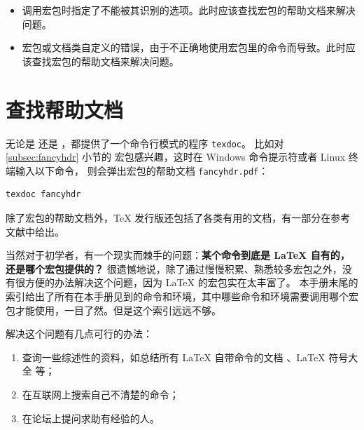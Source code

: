\begin{itemize}
相比之前的“Option clash”，隐性宏包冲突是更难以解决的问题，对各种宏包不熟悉的用户，尤其是使用模板的用户而言，往往难以下手。
用户可尝试查找引起冲突的宏包的帮助文档。详尽的手册里通常会告知用户这个宏包应当在某个宏包的前面/后面调用，或者不能与某个宏包一起调用。
如果是模板调用了大量宏包导致冲突，可联系模板的作者解决。

\item {}

调用宏包时指定了不能被其识别的选项。此时应该查找宏包的帮助文档来解决问题。

\item {}

宏包或文档类自定义的错误，由于不正确地使用宏包里的命令而导致。此时应该查找宏包的帮助文档来解决问题。

\end{itemize}

\section{查找帮助文档}\label{sec:texdoc}

无论是  还是 ，都提供了一个命令行模式的程序 \texttt{texdoc}。
比如对 \ref{subsec:fancyhdr} 小节的  宏包感兴趣，这时在 Windows 命令提示符或者 Linux 终端输入以下命令，
则会弹出宏包的帮助文档 \texttt{fancyhdr.pdf}：
\begin{verbatim}
texdoc fancyhdr
\end{verbatim}

除了宏包的帮助文档外，\TeX{} 发行版还包括了各类有用的文档，有一部分在参考文献中给出。


当然对于初学者，有一个现实而棘手的问题：\textbf{某个命令到底是 \LaTeX{} 自有的，还是哪个宏包提供的？}
很遗憾地说，除了通过慢慢积累、熟悉较多宏包之外，没有很方便的办法解决这个问题，因为 \LaTeX{} 的宏包实在太丰富了。
本手册末尾的索引给出了所有在本手册见到的命令和环境，其中哪些命令和环境需要调用哪个宏包才能使用，一目了然。但是这个索引远远不够。

解决这个问题有几点可行的办法：
\begin{enumerate}
  \item 查询一些综述性的资料，如总结所有 \LaTeX{} 自带命令的文档 \cite{latex2e}、\LaTeX{} 符号大全 \cite{symbols} 等；
  \item 在互联网上搜索自己不清楚的命令；
  \item 在论坛上提问求助有经验的人。
\end{enumerate}

